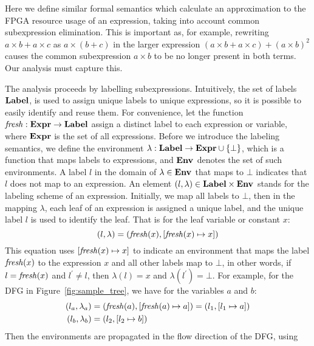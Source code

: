 Here we define similar formal semantics which calculate an approximation to the
FPGA resource usage of an expression, taking into account common subexpression
elimination. This is important as, for example, rewriting $a \times b + a
\times c$ as $a \times (b + c)$ in the larger expression $(a \times b + a
\times c) + {(a \times b)}^2$ causes the common subexpression $a \times b$ to
be no longer present in both terms. Our analysis must capture this.

The analysis proceeds by labelling subexpressions. Intuitively, the set of
labels $\mathbf{Label}$, is used to assign unique labels to unique expressions,
so it is possible to easily identify and reuse them. For convenience, let
the function $\operatorname{\mathit{fresh}}: \mathbf{Expr}\to\mathbf{Label}$ assign a distinct label to each
expression or variable, where $\mathbf{Expr}$ is the set of all expressions. Before
we introduce the labeling semantics, we define the environment $\lambda:
\mathbf{Label}\to\mathbf{Expr}\cup\{\bot\}$, which is a function that maps labels to
expressions, and $\mathbf{Env}_{}$ denotes the set of such environments. A label $l$ in
the domain of $\lambda\in\mathbf{Env}_{}$ that maps to $\bot$ indicates that $l$ does
not map to an expression. An element $(l, \lambda)\in\mathbf{Label}\times\mathbf{Env}_{}$
stands for the labeling scheme of an expression. Initially, we map all labels
to $\bot$, then in the mapping $\lambda$, each leaf of an expression is
assigned a unique label, and the unique label $l$ is used to identify the leaf.
That is for the leaf variable or constant $x$:
\begin{equation}
    (l, \lambda) = (\operatorname{\mathit{fresh}}(x), [\operatorname{\mathit{fresh}}(x)\mapsto{x}])
\end{equation}
This equation uses $[\operatorname{\mathit{fresh}}(x)\mapsto{x}]$ to indicate an environment that
maps the label $\operatorname{\mathit{fresh}}(x)$ to the expression $x$ and all other labels map
to $\bot$, in other words, if $l = \operatorname{\mathit{fresh}}(x)$ and $l^\prime \neq l$, then
$\lambda(l) = x$ and $\lambda(l^\prime) = \bot$. For example, for the DFG in
Figure~\ref{fig:sample_tree}, we have for the variables $a$ and $b$:
\begin{equation}
    \begin{aligned}
        (l_a, \lambda_a) &= (\operatorname{\mathit{fresh}}(a), [\operatorname{\mathit{fresh}}(a)\mapsto{a}])
                   = (l_1, [l_1 \mapsto a]) \\
        (l_b, \lambda_b) &= (l_2, [l_2 \mapsto b])
    \end{aligned}
    \label{eq:variable_env}
\end{equation}
Then the environments are propagated in the flow direction of the DFG, using

